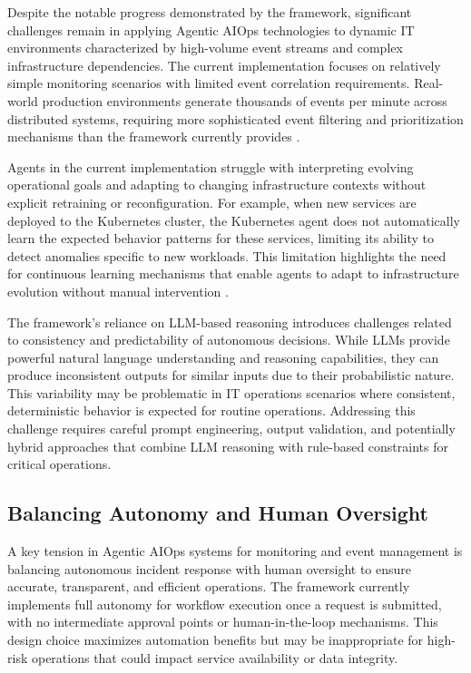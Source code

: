 \documentclass{article}
\begin{document}
Despite the notable progress demonstrated by the framework, significant challenges remain in applying Agentic AIOps technologies to dynamic IT environments characterized by high-volume event streams and complex infrastructure dependencies. The current implementation focuses on relatively simple monitoring scenarios with limited event correlation requirements. Real-world production environments generate thousands of events per minute across distributed systems, requiring more sophisticated event filtering and prioritization mechanisms than the framework currently provides \cite{li2023}.

Agents in the current implementation struggle with interpreting evolving operational goals and adapting to changing infrastructure contexts without explicit retraining or reconfiguration. For example, when new services are deployed to the Kubernetes cluster, the Kubernetes agent does not automatically learn the expected behavior patterns for these services, limiting its ability to detect anomalies specific to new workloads. This limitation highlights the need for continuous learning mechanisms that enable agents to adapt to infrastructure evolution without manual intervention \cite{duan2024}.

The framework's reliance on LLM-based reasoning introduces challenges related to consistency and predictability of autonomous decisions. While LLMs provide powerful natural language understanding and reasoning capabilities, they can produce inconsistent outputs for similar inputs due to their probabilistic nature. This variability may be problematic in IT operations scenarios where consistent, deterministic behavior is expected for routine operations. Addressing this challenge requires careful prompt engineering, output validation, and potentially hybrid approaches that combine LLM reasoning with rule-based constraints for critical operations.

\subsection{Balancing Autonomy and Human Oversight}

A key tension in Agentic AIOps systems for monitoring and event management is balancing autonomous incident response with human oversight to ensure accurate, transparent, and efficient operations. The framework currently implements full autonomy for workflow execution once a request is submitted, with no intermediate approval points or human-in-the-loop mechanisms. This design choice maximizes automation benefits but may be inappropriate for high-risk operations that could impact service availability or data integrity.
\end{document}

